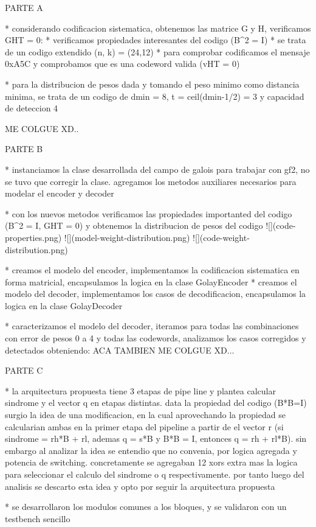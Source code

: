 PARTE A

* considerando codificacion sistematica, obtenemos las matrice G y H, verificamos GHT = 0:
* verificamos propiedades interesantes del codigo (B^2 = I)
* se trata de un codigo extendido (n, k) = (24,12)
* para comprobar codificamos el mensaje 0xA5C y comprobamos que es una codeword valida (vHT = 0)

* para la distribucion de pesos dada y tomando el peso minimo como distancia minima, se trata de un codigo de dmin = 8, t = ceil(dmin-1/2) = 3 y capacidad de deteccion 4

ME COLGUE XD..

PARTE B

* instanciamos la clase desarrollada del campo de galois para trabajar con gf2, no se tuvo que corregir la clase. agregamos los metodos auxiliares necesarios para modelar el encoder y decoder

* con los nuevos metodos verificamos las propiedades importanted del codigo (B^2 = I, GHT = 0) y obtenemos la distribucion de pesos del codigo
![](code-properties.png)
![](model-weight-distribution.png)
![](code-weight-distribution.png)

* creamos el modelo del encoder, implementamos la codificacion sistematica en forma matricial, encapsulamos la logica en la clase GolayEncoder 
* creamos el modelo del decoder, implementamos los casos de decodificacion, encapsulamos la logica en la clase GolayDecoder

* caracterizamos el modelo del decoder, iteramos para todas las combinaciones con error de pesos 0 a 4 y todas las codewords, analizamos los casos corregidos y detectados obteniendo:
ACA TAMBIEN ME COLGUE XD...

PARTE C

* la arquitectura propuesta tiene 3 etapas de pipe line y plantea calcular sindrome y el vector q en etapas distintas. data la propiedad del codigo (B*B=I) surgio la idea de una modificacion, en la cual aprovechando la propiedad se calcularian ambas en la primer etapa del pipeline a partir de el vector r (si sindrome = rh*B + rl, ademas q = s*B y B*B = I, entonces q = rh + rl*B). sin embargo al analizar la idea se entendio que no convenia, por logica agregada y potencia de switching. concretamente se agregaban 12 xors extra mas la logica para seleccionar el calculo del sindrome o q respectivamente. por tanto luego del analisis se descarto esta idea y opto por seguir la arquitectura propuesta

* se desarrollaron los modulos comunes a los bloques, y se validaron con un testbench sencillo

